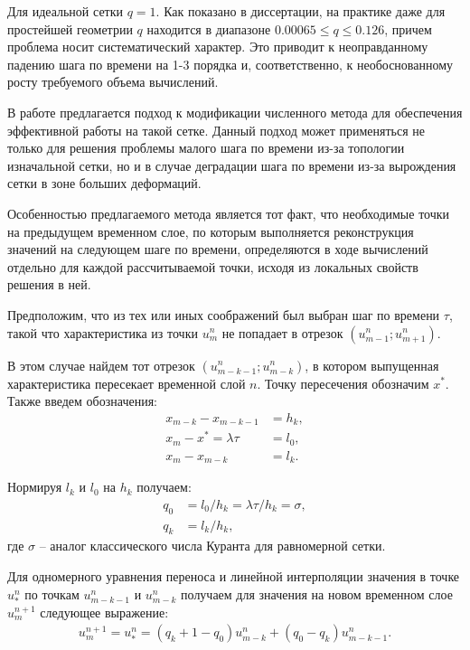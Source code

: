 Для идеальной сетки $q = 1$. Как показано в диссертации, на практике даже для простейшей геометрии $q$ находится в диапазоне $0.00065 \le q \le 0.126$, причем проблема носит систематический характер. Это приводит к неоправданному падению шага по времени на 1-3 порядка и, соответственно, к необоснованному росту требуемого объема вычислений.

В работе предлагается подход к модификации численного метода для обеспечения эффективной работы на такой сетке. Данный подход может применяться не только для решения проблемы малого шага по времени из-за топологии изначальной сетки, но и в случае деградации шага по времени из-за вырождения сетки в зоне больших деформаций.

Особенностью предлагаемого метода является тот факт, что необходимые точки на предыдущем временном слое, по которым выполняется реконструкция значений на следующем шаге по времени, определяются в ходе вычислений отдельно для каждой рассчитываемой точки, исходя из локальных свойств решения в ней.

Предположим, что из тех или иных соображений был выбран шаг по времени $\tau$, такой что характеристика из точки $u_m^n$ не попадает в отрезок $(u_{m-1}^n; u_{m+1}^n)$.

В этом случае найдем тот отрезок $(u_{m-k-1}^n; u_{m-k}^n)$, в котором выпущенная характеристика пересекает временной слой $n$. Точку пересечения обозначим $x^*$. Также введем обозначения:
\begin{align}
x_{m-k} - x_{m-k-1} &= h_k,\nonumber\\
x_m - x^* = \lambda \tau &= l_0,\nonumber\\
x_m - x_{m-k} &= l_k.
\end{align}

Нормируя $l_k$ и $l_0$ на $h_k$ получаем:
\begin{align}
q_0 &= l_0 / h_k = \lambda \tau / h_k = \sigma,\nonumber\\
q_k &= l_k / h_k,
\end{align}
где $\sigma$ -- аналог классического числа Куранта для равномерной сетки.

Для одномерного уравнения переноса и линейной интерполяции значения в точке $u_*^n$ по точкам  $u_{m-k-1}^n$ и $u_{m-k}^n$ получаем для значения на новом временном слое $u_m^{n+1}$ следующее выражение:
\begin{align}
\label{newmethod_1d_scheme}
u_m^{n+1} = u_*^n = (q_k + 1 - q_0) u_{m-k}^n + (q_0 - q_k) u_{m-k-1}^n.
\end{align}

